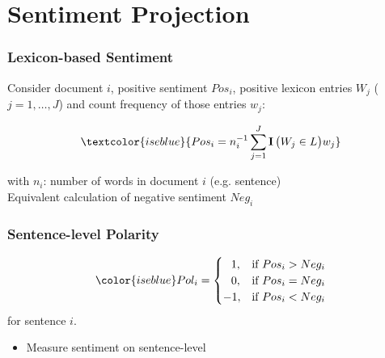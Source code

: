 \section{Sentiment Projection}
\label{lab:projection}

\begin{frame}
    \frametitle{Lexicon-based Sentiment}
    Consider document $i$, positive sentiment $Pos_i$, positive lexicon entries $W_j$ ($j = 1, \ldots, J$) and count frequency of those entries $w_j$:

    \begin{equation}
        \textcolor{iseblue}{Pos_i = n^{-1}_i \sum_{j=1}^J{  \operatorname{\mathbf{I}}\big( W_j \in L \big) w_{j} }}
    \end{equation}

    \vspace{20pt}
    with $n_i$: number of words in document $i$ (e.g. sentence) \\
    \vspace{10pt}
    Equivalent calculation of negative sentiment $Neg_i$
\end{frame}


\begin{frame}
    \frametitle{Sentence-level Polarity}

    \begin{equation}
        {\color{iseblue}
        Pol_i = 
        \begin{cases}
             \;\;\,1,& \text{if }  Pos_i > Neg_i\\
             \;\;\,0,& \text{if }  Pos_i = Neg_i\\
            -      1,& \text{if }  Pos_i < Neg_i\\
        \end{cases}
        }
    \end{equation}
    for sentence $i$.

    \vspace{10pt}
    \begin{itemize}
        \item Measure sentiment on sentence-level
    \end{itemize}
\end{frame}


